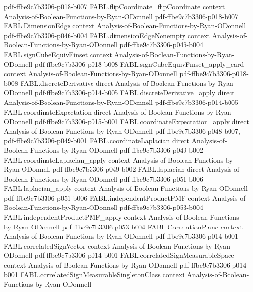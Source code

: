 \begin{theorem}
  {pdf-ffbe9c7b3306-p018-b007}
\proofstep
  {FABL.flipCoordinate_flipCoordinate}
  {context}
  {Analysis-of-Boolean-Functions-by-Ryan-ODonnell}
  {pdf-ffbe9c7b3306-p018-b007}
\proofstep
  {FABL.DimensionEdge}
  {context}
  {Analysis-of-Boolean-Functions-by-Ryan-ODonnell}
  {pdf-ffbe9c7b3306-p046-b004}
\proofstep
  {FABL.dimensionEdgeNonempty}
  {context}
  {Analysis-of-Boolean-Functions-by-Ryan-ODonnell}
  {pdf-ffbe9c7b3306-p046-b004}
\proofstep
  {FABL.signCubeEquivFinset}
  {context}
  {Analysis-of-Boolean-Functions-by-Ryan-ODonnell}
  {pdf-ffbe9c7b3306-p018-b008}
\proofstep
  {FABL.signCubeEquivFinset_apply_card}
  {context}
  {Analysis-of-Boolean-Functions-by-Ryan-ODonnell}
  {pdf-ffbe9c7b3306-p018-b008}
\proofstep
  {FABL.discreteDerivative}
  {direct}
  {Analysis-of-Boolean-Functions-by-Ryan-ODonnell}
  {pdf-ffbe9c7b3306-p014-b005}
\proofstep
  {FABL.discreteDerivative_apply}
  {direct}
  {Analysis-of-Boolean-Functions-by-Ryan-ODonnell}
  {pdf-ffbe9c7b3306-p014-b005}
\proofstep
  {FABL.coordinateExpectation}
  {direct}
  {Analysis-of-Boolean-Functions-by-Ryan-ODonnell}
  {pdf-ffbe9c7b3306-p015-b001}
\proofstep
  {FABL.coordinateExpectation_apply}
  {direct}
  {Analysis-of-Boolean-Functions-by-Ryan-ODonnell}
  {pdf-ffbe9c7b3306-p048-b007,
    pdf-ffbe9c7b3306-p049-b001}
\proofstep
  {FABL.coordinateLaplacian}
  {direct}
  {Analysis-of-Boolean-Functions-by-Ryan-ODonnell}
  {pdf-ffbe9c7b3306-p049-b002}
\proofstep
  {FABL.coordinateLaplacian_apply}
  {context}
  {Analysis-of-Boolean-Functions-by-Ryan-ODonnell}
  {pdf-ffbe9c7b3306-p049-b002}
\proofstep
  {FABL.laplacian}
  {direct}
  {Analysis-of-Boolean-Functions-by-Ryan-ODonnell}
  {pdf-ffbe9c7b3306-p051-b006}
\proofstep
  {FABL.laplacian_apply}
  {context}
  {Analysis-of-Boolean-Functions-by-Ryan-ODonnell}
  {pdf-ffbe9c7b3306-p051-b006}
\proofstep
  {FABL.independentProductPMF}
  {context}
  {Analysis-of-Boolean-Functions-by-Ryan-ODonnell}
  {pdf-ffbe9c7b3306-p053-b004}
\proofstep
  {FABL.independentProductPMF_apply}
  {context}
  {Analysis-of-Boolean-Functions-by-Ryan-ODonnell}
  {pdf-ffbe9c7b3306-p053-b004}
\proofstep
  {FABL.CorrelationPlane}
  {context}
  {Analysis-of-Boolean-Functions-by-Ryan-ODonnell}
  {pdf-ffbe9c7b3306-p014-b001}
\proofstep
  {FABL.correlatedSignVector}
  {context}
  {Analysis-of-Boolean-Functions-by-Ryan-ODonnell}
  {pdf-ffbe9c7b3306-p014-b001}
\proofstep
  {FABL.correlatedSignMeasurableSpace}
  {context}
  {Analysis-of-Boolean-Functions-by-Ryan-ODonnell}
  {pdf-ffbe9c7b3306-p014-b001}
\proofstep
  {FABL.correlatedSignMeasurableSingletonClass}
  {context}
  {Analysis-of-Boolean-Functions-by-Ryan-ODonnell}

\end{theorem}
